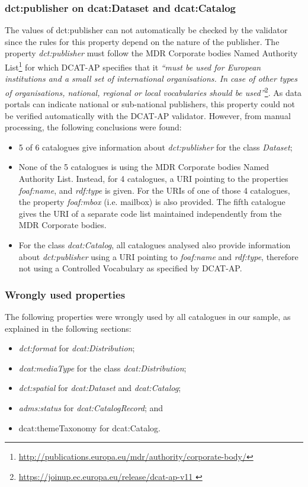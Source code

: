 \documentclass[<options>]{elsarticle}
\begin{document}
\subsubsection{dct:publisher on dcat:Dataset and dcat:Catalog}
The values of dct:publisher can not automatically be checked by the validator since the rules for this property depend on the nature of the publisher. The property \textit{dct:publisher} must follow the MDR Corporate bodies Named Authority List\footnote{\href{      http://publications.europa.eu/mdr/authority/corporate-body/}{http://publications.europa.eu/mdr/authority/corporate-body/}} for which DCAT-AP specifies that it \textit{“must be used for European institutions and a small set of international organisations. In case of other types of organisations, national, regional or local vocabularies should be used”}\footnote{\href{https://joinup.ec.europa.eu/release/dcat-ap-v11}{    https://joinup.ec.europa.eu/release/dcat-ap-v11 }}. As data portals can indicate national or sub-national publishers, this property could not be verified automatically with the DCAT-AP validator. However, from manual processing, the following conclusions were found:

\begin{itemize}
\item 5 of 6 catalogues give information about \textit{dct:publisher} for the class \textit{Dataset};
\item None of the 5 catalogues is using the MDR Corporate bodies Named Authority List. Instead, for 4 catalogues, a URI pointing to the properties \textit{foaf:name}, and \textit{rdf:type} is given. For the URIs of one of those 4 catalogues, the property \textit{foaf:mbox} (i.e. mailbox) is also provided. The fifth catalogue gives the URI of a separate code list maintained independently from the MDR Corporate bodies.
\item For the class \textit{dcat:Catalog}, all catalogues analysed also provide information about \textit{dct:publisher} using a URI pointing to \textit{foaf:name} and \textit{rdf:type}, therefore not using a Controlled Vocabulary as specified by DCAT-AP.
\end{itemize}

\subsubsection{Wrongly used properties}
The following properties were wrongly used by all catalogues in our sample, as explained in the following sections: 
\begin{itemize}
\item \textit{dct:format} for \textit{dcat:Distribution};
\item \textit{dcat:mediaType} for the class \textit{dcat:Distribution}; 
\item \textit{dct:spatial} for \textit{dcat:Dataset} and \textit{dcat:Catalog}; 
\item \textit{adms:status} for \textit{dcat:CatalogRecord}; and 
\item dcat:themeTaxonomy for dcat:Catalog.
\end{itemize}
\end{document}
